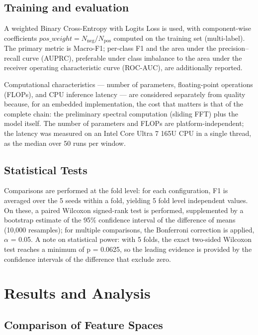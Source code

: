 \documentclass{ieeeojies}
\begin{document}
\subsection{Training and evaluation}



A weighted Binary Cross-Entropy with Logits Loss is used, with component-wise coefficients $\mathit{pos\_weight} = N_{\mathrm{neg}}/N_{\mathrm{pos}}$ computed on the training set (multi-label). The primary metric is Macro-F1; per-class F1 and the area under the precision–recall curve (AUPRC), preferable under class imbalance to the area under the receiver operating characteristic curve (ROC-AUC), are additionally reported. 

Computational characteristics — number of parameters, floating-point operations (FLOPs), and CPU inference latency — are considered separately from quality because, for an embedded implementation, the cost that matters is that of the complete chain: the preliminary spectral computation (sliding FFT) plus the model itself. The number of parameters and FLOPs are platform-independent; the latency was measured on an Intel Core Ultra 7 165U CPU in a single thread, as the median over 50 runs per window.

\subsection{Statistical Tests}

Comparisons are performed at the fold level: for each configuration, F1 is averaged over the 5 seeds within a fold, yielding 5 fold level independent values. On these, a paired Wilcoxon signed-rank test is performed, supplemented by a bootstrap estimate of the 95\% confidence interval of the difference of means (10,000 resamples); for multiple comparisons, the Bonferroni correction is applied, $\alpha$ = 0.05. A note on statistical power: with 5 folds, the exact two-sided Wilcoxon test reaches a minimum of p = 0.0625, so the leading evidence is provided by the confidence intervals of the difference that exclude zero.

\section{Results and Analysis}

\subsection{Comparison of Feature Spaces}
\end{document}
